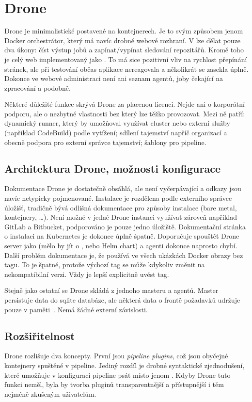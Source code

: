 \section{Drone}
    Drone je minimalistické \CI postavené na kontejnerech. Je to svým způsobem jenom Docker orchestrátor, který má navíc drobné webové rozhraní. V  lze dělat pouze dva úkony: číst výstup jobů a zapínat/vypínat sledování repozitářů. Kromě toho je celý web implementovaný jako . To má sice pozitivní vliv na rychlost přepínání stránek, ale při testování občas aplikace nereagovala a několikrát se zasekla úplně. Dokonce ve webové administraci není ani seznam agentů, joby čekající na zpracování a podobně.

    Některé důležité funkce skrývá Drone za placenou licenci. Nejde ani o korporátní podporu, ale o nezbytné vlastnosti bez který lze \CI těžko provozovat. Mezi ně patří: dynamický runner, který by umožňoval využívat cluster nebo externí služby (například  CodeBuild) podle vytížení; sdílení tajemství napříč organizací a obecně podpora pro externí správce tajemství; šablony pro pipeline.

    \subsection{Architektura Drone, možnosti konfigurace}
        Dokumentace Drone je dostatečně obsáhlá, ale není vyčerpávající a odkazy jsou navíc netypicky pojmenované. Instalace je rozdělena podle externího správce úložišť, tradičně bývá odlišná dokumentace pro způsoby instalace (bare metal, kontejnery, \ldots). Není možné v jedné Drone instanci využívat zároveň například GitLab a Bitbucket, podporováno je pouze jedno úložiště. Dokumentační stránka o instalaci na Kubernetes je dokonce úplně špatně. Doporučuje spouštět Drone server jako  (mělo by jít o , nebo Helm chart) a agenti dokonce naprosto chybí. Další problém dokumentace je, že používá ve všech ukázkách Docker obrazy bez tagu. To je špatně, protože výchozí tag  se může kdykoliv změnit na nekompatibilní verzi. Vždy je lepší explicitně uvést tag.

        Stejně jako ostatní \CI se Drone skládá z jednoho masteru a agentů. Master persistuje data do sqlite databáze, ale některá data o frontě požadavků udržuje pouze v paměti~\cite{drone-ha}. Nemá žádné externí závislosti.

    \subsection{Rozšiřitelnost}
        Drone rozlišuje dva koncepty. První jsou \textit{pipeline plugins}, což jsou obyčejné kontejnery spuštěné v pipeline. Jediný rozdíl je drobné syntaktické zjednodušení, které umožňuje v konfiguraci pipeline psát místo  jenom . Kdyby Drone tuto funkci neměl, byla by tvorba pluginů transparentnější a přístupnější i těm nejméně zkušeným uživatelům.


